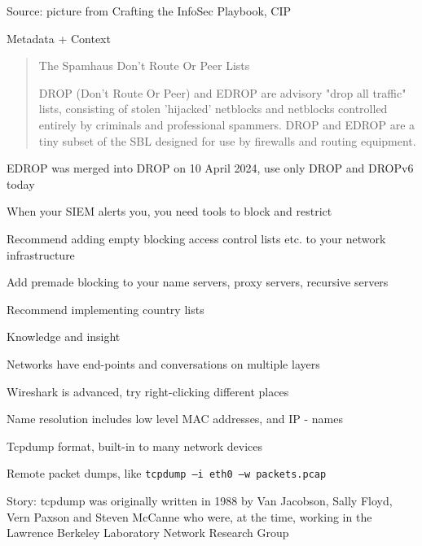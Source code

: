\documentclass[Screen16to9,17pt]{foils}
\begin{document}


Source: picture from Crafting the InfoSec Playbook, CIP

Metadata + Context



\begin{quote}
The Spamhaus Don't Route Or Peer Lists

DROP (Don't Route Or Peer) and EDROP are advisory "drop all traffic" lists, consisting of stolen 'hijacked' netblocks and netblocks controlled entirely by criminals and professional spammers. DROP and EDROP are a tiny subset of the SBL designed for use by firewalls and routing equipment.
\end{quote}



\begin{list2}
\item EDROP was merged into DROP on 10 April 2024, use only DROP and DROPv6 today
\item When your SIEM alerts you, you need tools to block and restrict
\item Recommend adding empty blocking access control lists etc. to your network infrastructure
\item Add premade blocking to your name servers, proxy servers, recursive servers
\item Recommend implementing country lists
\end{list2}




{\Large Knowledge and insight}
\begin{list2}
\item Networks have end-points and conversations on multiple layers
\item Wireshark is advanced, try right-clicking different places
\item Name resolution includes low level MAC addresses, and IP - names
\end{list2}

\begin{list2}
\item Tcpdump format, built-in to many network devices
\item Remote packet dumps, like \verb+tcpdump –i eth0 –w packets.pcap+
\item Story: tcpdump was originally written in 1988 by Van Jacobson, Sally Floyd, Vern Paxson and Steven McCanne who were, at the time, working in the Lawrence Berkeley Laboratory Network Research Group\\
\end{list2}
\end{document}
